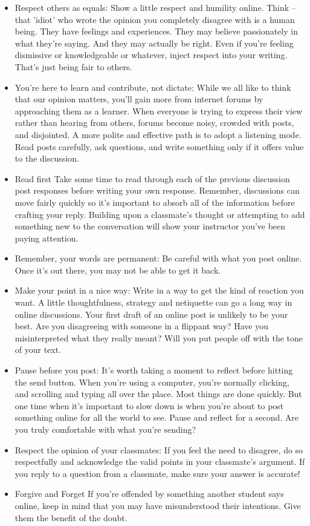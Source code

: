 \documentclass{article}
\begin{document}
\begin{itemize}
    \item  Respect others as equals:
    Show a little respect and humility online. Think – that 'idiot' who wrote the opinion you completely disagree with is a human being. They have feelings and experiences. They may believe passionately in what they're saying. And they may actually be right.
    Even if you're feeling dismissive or knowledgeable or whatever, inject respect into your writing. That's just being fair to others.
    \item You're here to learn and contribute, not dictate: 
    While we all like to think that our opinion matters, you'll gain more from internet forums by approaching them as a learner.
    When everyone is trying to express their view rather than hearing from others, forums become noisy, crowded with posts, and disjointed. 
    A more polite and effective path is to adopt a listening mode. Read posts carefully, ask questions, and write something only if it offers value to the discussion.
    \item Read first
    Take some time to read through each of the previous discussion post responses before writing your own response. Remember, discussions can move fairly quickly so it’s important to absorb all of the information before crafting your reply. Building upon a classmate’s thought or attempting to add something new to the conversation will show your instructor you’ve been paying attention.
    \item Remember, your words are permanent: Be careful with what you post online. Once it's out there, you may not be able to get it back.
    \item Make your point in a nice way:
    Write in a way to get the kind of reaction you want. A little thoughtfulness, strategy and netiquette can go a long way in online discussions.
    Your first draft of an online post is unlikely to be your best. Are you disagreeing with someone in a flippant way? Have you misinterpreted what they really meant? Will you put people off with the tone of your text.
    \item Pause before you post:
    It's worth taking a moment to reflect before hitting the send button.
    When you're using a computer, you're normally clicking, and scrolling and typing all over the place. Most things are done quickly. But one time when it's important to slow down is when you're about to post something online for all the world to see. Pause and reflect for a second. Are you truly comfortable with what you're sending?
    \item Respect the opinion of your classmates: 
    If you feel the need to disagree, do so respectfully and acknowledge the valid points in your classmate's argument. If you reply to a question from a classmate, make sure your answer is accurate!
    \item Forgive and Forget
    If you’re offended by something another student says online, keep in mind that you may have misunderstood their intentions. Give them the benefit of the doubt.
 \end{itemize}
\end{document}
